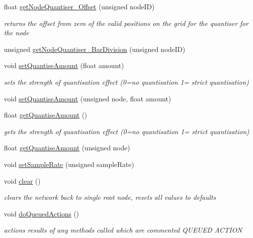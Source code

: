 \begin{DoxyCompactItemize}
float \hyperlink{classMatsuokaEngine_a05ab0eeb8a7d0b7f3a478ba41735cb8d}{get\+Node\+Quantiser\+\_\+\+Offset} (unsigned node\+ID)
\begin{DoxyCompactList}\small\item\em returns the offset from zero of the valid positions on the grid for the quantiser for the node \end{DoxyCompactList}\item 
unsigned \hyperlink{classMatsuokaEngine_af7edec268c651be3a45061cf9e90c123}{get\+Node\+Quantiser\+\_\+\+Bar\+Division} (unsigned node\+ID)
\item 
void \hyperlink{classMatsuokaEngine_a9057153267968489cd83ca31a1fbd985}{set\+Quantise\+Amount} (float amount)
\begin{DoxyCompactList}\small\item\em sets the strength of quantisation effect (0=no quantisation 1= strict quantisation) \end{DoxyCompactList}\item 
void \hyperlink{classMatsuokaEngine_ae053fd0bdd438fa8a7f4cbd151122f89}{set\+Quantise\+Amount} (unsigned node, float amount)
\item 
float \hyperlink{classMatsuokaEngine_aaf73c32f2c81d4895e98e1a8fe31cea1}{get\+Quantise\+Amount} ()
\begin{DoxyCompactList}\small\item\em gets the strength of quantisation effect (0=no quantisation 1= strict quantisation) \end{DoxyCompactList}\item 
float \hyperlink{classMatsuokaEngine_a8150c0efacb8f3d5ec2c3fb5731dfc97}{get\+Quantise\+Amount} (unsigned node)
\item 
void \hyperlink{classMatsuokaEngine_a23ee17f0e948af6fcccdaeefa2c4e246}{set\+Sample\+Rate} (unsigned sample\+Rate)
\item 
void \hyperlink{classMatsuokaEngine_a3bf65a238e682b78fee81cd13b49174d}{clear} ()
\begin{DoxyCompactList}\small\item\em clears the network back to single root node, resets all values to defaults \end{DoxyCompactList}\item 
void \hyperlink{classMatsuokaEngine_affd6ef89f68c1aa654229a07e0160f2e}{do\+Queued\+Actions} ()
\begin{DoxyCompactList}\small\item\em actions results of any methods called which are commented Q\+U\+E\+U\+ED A\+C\+T\+I\+ON \end{DoxyCompactList}\item 

\end{DoxyCompactItemize}
